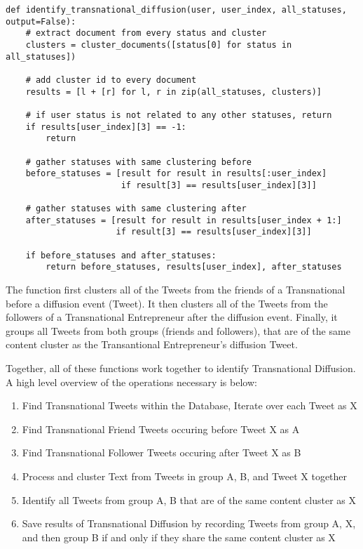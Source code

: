 \begin{lstlisting}
def identify_transnational_diffusion(user, user_index, all_statuses, output=False):
    # extract document from every status and cluster
    clusters = cluster_documents([status[0] for status in all_statuses])
    
    # add cluster id to every document
    results = [l + [r] for l, r in zip(all_statuses, clusters)]
    
    # if user status is not related to any other statuses, return
    if results[user_index][3] == -1:
        return
    
    # gather statuses with same clustering before
    before_statuses = [result for result in results[:user_index]
                       if result[3] == results[user_index][3]]
    
    # gather statuses with same clustering after
    after_statuses = [result for result in results[user_index + 1:]
                      if result[3] == results[user_index][3]]
    
    if before_statuses and after_statuses:
        return before_statuses, results[user_index], after_statuses
\end{lstlisting}

The function first clusters all of the Tweets from the friends of a
Transnational before a diffusion event (Tweet). It then clusters all
of the Tweets from the followers of a Transnational Entrepreneur after
the diffusion event. Finally, it groups all Tweets from both groups
(friends and followers), that are of the same content cluster as the
Transantional Entrepreneur's diffusion Tweet.

Together, all of these functions work together to identify
Transnational Diffusion. A high level overview of the operations
necessary is below:

\begin{enumerate}
\item Find Transnational Tweets within the Database, Iterate over each
  Tweet as X
\item Find Transnational Friend Tweets occuring before Tweet X as A
\item Find Transnational Follower Tweets occuring after Tweet X as B
\item Process and cluster Text from Tweets in group A, B, and Tweet X together
\item Identify all Tweets from group A, B that are of the same content cluster as X
\item Save results of Transnational Diffusion by recording Tweets from
  group A, X, and then group B if and only if they share the same
  content cluster as X
\end{enumerate}